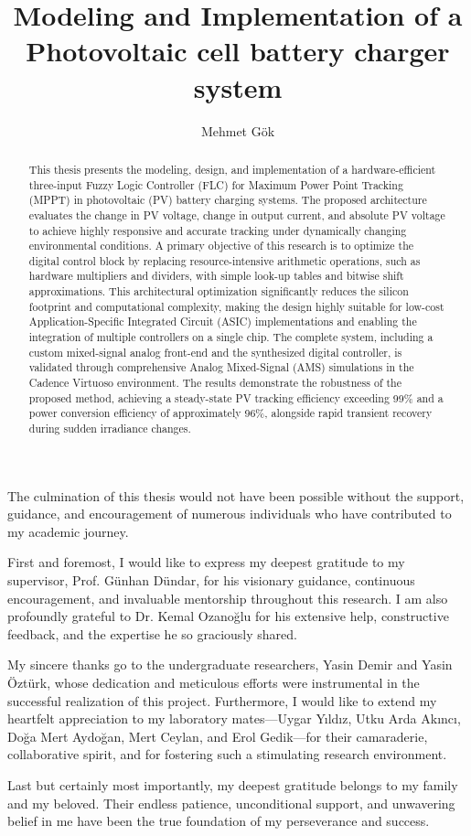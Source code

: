 \documentclass[a4paper,oneside,12pt]{report}
\title{Modeling and Implementation of a Photovoltaic cell battery charger system}
\author{Mehmet Gök}
\numberwithin{equation}{chapter}
\begin{document}
\makemstitle %
\makeapprovalpage

\begin{acknowledgements}
The culmination of this thesis would not have been possible without the support, guidance, and encouragement of numerous individuals who have contributed to my academic journey.

First and foremost, I would like to express my deepest gratitude to my supervisor, Prof. Günhan Dündar, for his visionary guidance, continuous encouragement, and invaluable mentorship throughout this research. I am also profoundly grateful to Dr. Kemal Ozanoğlu for his extensive help, constructive feedback, and the expertise he so graciously shared.

My sincere thanks go to the undergraduate researchers, Yasin Demir and Yasin Öztürk, whose dedication and meticulous efforts were instrumental in the successful realization of this project. Furthermore, I would like to extend my heartfelt appreciation to my laboratory mates---Uygar Yıldız, Utku Arda Akıncı, Doğa Mert Aydoğan, Mert Ceylan, and Erol Gedik---for their camaraderie, collaborative spirit, and for fostering such a stimulating research environment.

Last but certainly most importantly, my deepest gratitude belongs to my family and my beloved. Their endless patience, unconditional support, and unwavering belief in me have been the true foundation of my perseverance and success.
\end{acknowledgements}

\begin{abstract}
This thesis presents the modeling, design, and implementation of a hardware-efficient three-input Fuzzy Logic Controller (FLC) for Maximum Power Point Tracking (MPPT) in photovoltaic (PV) battery charging systems. The proposed architecture evaluates the change in PV voltage, change in output current, and absolute PV voltage to achieve highly responsive and accurate tracking under dynamically changing environmental conditions. A primary objective of this research is to optimize the digital control block by replacing resource-intensive arithmetic operations, such as hardware multipliers and dividers, with simple look-up tables and bitwise shift approximations. This architectural optimization significantly reduces the silicon footprint and computational complexity, making the design highly suitable for low-cost Application-Specific Integrated Circuit (ASIC) implementations and enabling the integration of multiple controllers on a single chip. The complete system, including a custom mixed-signal analog front-end and the synthesized digital controller, is validated through comprehensive Analog Mixed-Signal (AMS) simulations in the Cadence Virtuoso environment. The results demonstrate the robustness of the proposed method, achieving a steady-state PV tracking efficiency exceeding 99\% and a power conversion efficiency of approximately 96\%, alongside rapid transient recovery during sudden irradiance changes.
\end{abstract}
\end{document}
